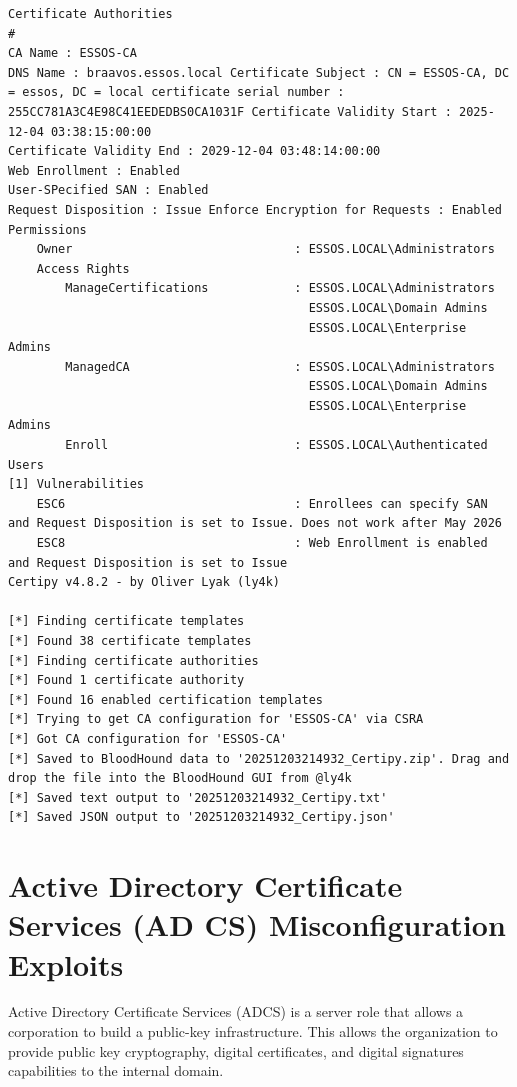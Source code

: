 \begin{notebox}
\begin{verbatim}
Certificate Authorities
#
CA Name : ESSOS-CA
DNS Name : braavos.essos.local Certificate Subject : CN = ESSOS-CA, DC = essos, DC = local certificate serial number : 255CC781A3C4E98C41EEDEDBS0CA1031F Certificate Validity Start : 2025-12-04 03:38:15:00:00
Certificate Validity End : 2029-12-04 03:48:14:00:00
Web Enrollment : Enabled
User-SPecified SAN : Enabled
Request Disposition : Issue Enforce Encryption for Requests : Enabled
Permissions
    Owner                               : ESSOS.LOCAL\Administrators
    Access Rights
        ManageCertifications            : ESSOS.LOCAL\Administrators
                                          ESSOS.LOCAL\Domain Admins
                                          ESSOS.LOCAL\Enterprise Admins
        ManagedCA                       : ESSOS.LOCAL\Administrators
                                          ESSOS.LOCAL\Domain Admins
                                          ESSOS.LOCAL\Enterprise Admins
        Enroll                          : ESSOS.LOCAL\Authenticated Users
[1] Vulnerabilities
    ESC6                                : Enrollees can specify SAN and Request Disposition is set to Issue. Does not work after May 2026
    ESC8                                : Web Enrollment is enabled and Request Disposition is set to Issue
Certipy v4.8.2 - by Oliver Lyak (ly4k)

[*] Finding certificate templates
[*] Found 38 certificate templates
[*] Finding certificate authorities
[*] Found 1 certificate authority
[*] Found 16 enabled certification templates
[*] Trying to get CA configuration for 'ESSOS-CA' via CSRA
[*] Got CA configuration for 'ESSOS-CA'
[*] Saved to BloodHound data to '20251203214932_Certipy.zip'. Drag and drop the file into the BloodHound GUI from @ly4k
[*] Saved text output to '20251203214932_Certipy.txt'
[*] Saved JSON output to '20251203214932_Certipy.json'
\end{verbatim}
\end{notebox}


\chapter{Active Directory Certificate Services (AD CS) Misconfiguration Exploits}
Active Directory Certificate Services (ADCS) is a server role that allows a corporation to build a public-key infrastructure. This allows the organization to provide public key cryptography, digital certificates, and digital signatures capabilities to the internal domain.

